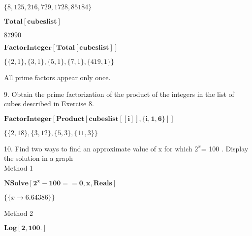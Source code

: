 \documentclass{article}
\begin{document}
\begin{doublespace}
\noindent\(\{8,125,216,729,1728,85184\}\)
\end{doublespace}

\begin{doublespace}
\noindent\(\pmb{\text{Total}[\text{cubeslist}]}\)
\end{doublespace}

\begin{doublespace}
\noindent\(87990\)
\end{doublespace}

\begin{doublespace}
\noindent\(\pmb{\text{FactorInteger}[\text{Total}[\text{cubeslist}]]}\)
\end{doublespace}

\begin{doublespace}
\noindent\(\{\{2,1\},\{3,1\},\{5,1\},\{7,1\},\{419,1\}\}\)
\end{doublespace}

All prime factors appear only once.

9. Obtain the prime factorization of the product of the integers in the list of cubes described in Exercise 8.\\


\begin{doublespace}
\noindent\(\pmb{\text{FactorInteger}[\text{Product}[\text{cubeslist}[[i]],\{i,1,6\}]]}\)
\end{doublespace}

\begin{doublespace}
\noindent\(\{\{2,18\},\{3,12\},\{5,3\},\{11,3\}\}\)
\end{doublespace}

10. Find two ways to find an approximate value of x for which \(2^x\)= 100 . Display the solution in a graph\\


Method 1

\begin{doublespace}
\noindent\(\pmb{\text{NSolve}\left[2^x-100==0,x,\text{Reals}\right]}\)
\end{doublespace}

\begin{doublespace}
\noindent\(\{\{x\to 6.64386\}\}\)
\end{doublespace}

Method 2

\begin{doublespace}
\noindent\(\pmb{\text{Log}[2,100.]}\)
\end{doublespace}
\end{document}
